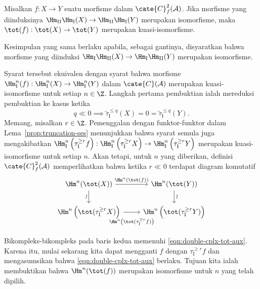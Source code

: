\begin{teorema}\label{prop:double-cplx-tot}
	Misalkan $f: X \to Y$ suatu morfisme dalam $\cate{C}^2_f(\mathcal{A})$. Jika
	morfisme yang diinduksinya
	$\Hm_{\mathrm{II}} \Hm_{\mathrm{I}} (X) \to
	\Hm_{\mathrm{II}} \Hm_{\mathrm{I}} (Y)$ merupakan isomorfisme, maka
	$\tot(f): \tot(X) \to \tot(Y)$ merupakan kuasi-isomorfisme.
	
	Kesimpulan yang sama berlaku apabila, sebagai gantinya, disyaratkan bahwa
	morfisme yang diinduksi
	$\Hm_{\mathrm{I}} \Hm_{\mathrm{II}} (X) \to
	\Hm_{\mathrm{I}} \Hm_{\mathrm{II}} (Y)$ merupakan isomorfisme.
\end{teorema}
\begin{bukti}
	Syarat tersebut ekuivalen dengan syarat bahwa morfisme
	$\Hm_{\mathrm{I}}^n(f): \Hm_{\mathrm{I}}^n(X) \to
	\Hm_{\mathrm{I}}^n(Y)$ dalam $\cate{C}(\mathcal{A})$ merupakan
	kuasi-isomorfisme untuk setiap $n \in \Z$. Langkah pertama pembuktian
	ialah mereduksi pembuktian ke kasus ketika
	\begin{equation}\label{eqn:double-cplx-tot-aux}
		q \ll 0 \implies \tilde{\tau}_{\mathrm{I}}^{\leq q}(X) = 0 = \tilde{\tau}_{\mathrm{I}}^{\leq q}(Y).
	\end{equation}
	Memang, misalkan $r \in \Z$. Pemenggalan dengan funktor-funktor dalam
	Lema~\ref{prop:truncation-ses} menunjukkan bahwa syarat semula juga
	mengakibatkan
	$\Hm_{\mathrm{I}}^n\left( \tau_{\mathrm{I}}^{\geq r} f \right):
	\Hm_{\mathrm{I}}^n \left(\tau_{\mathrm{I}}^{\geq r} X \right) \to
	\Hm_{\mathrm{I}}^n\left( \tau_{\mathrm{I}}^{\geq r} Y \right)$
	merupakan kuasi-isomorfisme untuk setiap $n$. Akan tetapi, untuk $n$ yang
	diberikan, definisi $\cate{C}^2_f(\mathcal{A})$ memperlihatkan bahwa ketika
	$r \ll 0$ terdapat diagram komutatif
	\begin{equation}\label{eqn:double-cplx-tot-aux2}\begin{tikzcd}
		\Hm^n(\tot(X)) \arrow[r, "{\Hm^n(\tot(f))}"] \arrow[d, "\sim"' sloped] & \Hm^n(\tot(Y)) \arrow[d, "\sim" sloped] \\
		\Hm^n\left( \tot(\tau_{\mathrm{I}}^{\geq r} X) \right) \arrow[r, "{\Hm^n\left( \tot (\tau_{\mathrm{I}}^{\geq r} f) \right)}"' inner sep=0.8em] & \Hm^n\left( \tot(\tau_{\mathrm{I}}^{\geq r} Y) \right)
	\end{tikzcd}\end{equation}
	Bikompleks-bikompleks pada baris kedua memenuhi
	\eqref{eqn:double-cplx-tot-aux}. Karena itu, mulai sekarang kita dapat
	mengganti $f$ dengan $\tau_{\mathrm{I}}^{\geq r} f$ dan mengasumsikan
	bahwa \eqref{eqn:double-cplx-tot-aux} berlaku. Tujuan kita ialah
	membuktikan bahwa $\Hm^n(\tot(f))$ merupakan isomorfisme untuk $n$ yang
	telah dipilih.
	

\end{bukti}
